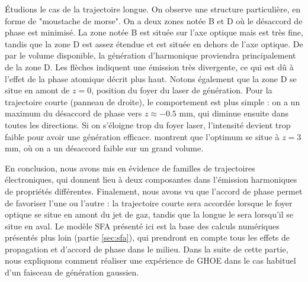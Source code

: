 \'Etudions le cas de la trajectoire longue. On observe une structure particulière, en forme de "moustache de morse". On a deux zones notée B et D où le désaccord de phase est minimisé. La zone notée B est située sur l'axe optique mais est très fine, tandis que la zone D est assez étendue et est située en dehors de l'axe optique. De par le volume disponible, la génération d'harmonique proviendra principalement de la zone D. Les flèches indiquent une émission très divergente, ce qui est dû à l'effet de la phase atomique décrit plus haut. Notons également que la zone D se situe en amont de $z=0$, position du foyer du laser de génération. Pour la trajectoire courte (panneau de droite), le comportement est plus simple : on a un maximum du désaccord de phase vers $z\approx-0.5$ mm, qui diminue ensuite dans toutes les directions. Si on s'éloigne trop du foyer laser, l'intensité devient trop faible pour avoir une génération efficace.  montrent que l'optimum se situe à $z=3$ mm, où on a un désaccord faible sur un grand volume. 

En conclusion, nous avons mis en évidence de familles de trajectoires électroniques, qui donnent lieu à deux composantes dans l'émission harmoniques de propriétés différentes. Finalement, nous avons vu que l'accord de phase permet de favoriser l'une ou l'autre : la trajectoire courte sera accordée lorsque le foyer optique se situe en amont du jet de gaz, tandis que la longue le sera lorsqu'il se situe en aval. Le modèle SFA présenté ici est la base des calculs numériques présentés plus loin (partie \ref{sec:sfa}), qui prendront en compte tous les effets de propagation et d'accord de phase dans le milieu. Dans la suite de cette partie, nous expliquons comment réaliser une expérience de GHOE dans le cas habituel d'un faisceau de génération gaussien.


